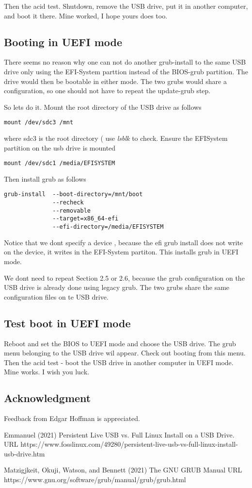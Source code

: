 \documentclass{article}  %
\begin{document}
Then the acid test. Shutdown, remove the USB drive, put it in another computer, and boot it there. Mine worked, I hope yours does too.


\subsection{Booting in UEFI mode}
 There seems no reason why one can not do another grub-install  to the same USB drive only using the EFI-System parttion instead of the BIOS-grub partition. The drive would then be bootable in either mode. The two grubs would share a configuration, so one should not have to repeat the update-grub step.

So lets do it. Mount the root directory of the USB drive as follows
\begin{verbatim}
mount /dev/sdc3 /mnt
\end{verbatim}
 where sdc3 is the root directory ( use {\em lsblk} to check.
Ensure the EFISystem partition on the usb drive is mounted
\begin{verbatim}
mount /dev/sdc1 /media/EFISYSTEM
\end{verbatim}

 Then install grub as follows
\begin{verbatim}
grub-install  --boot-directory=/mnt/boot
              --recheck
              --removable
              --target=x86_64-efi
              --efi-directory=/media/EFISYSTEM
\end{verbatim}
 Notice that we dont specify a device , because the efi grub install does not write on the device, it writes in the EFI-System partiton.  This installs grub in UEFI mode.

We dont need to repeat Section 2.5 or 2.6, because the grub configuration on the USB drive is already done using legacy grub. The two grubs share the same configuration files on te USB drive.

\subsection{Test boot in UEFI mode}
Reboot and set the BIOS to UEFI mode and choose the USB drive.  The grub menu belonging to the USB drive wil appear. Check out booting from this menu. 
Then the acid test - boot the USB drive in another computer in UEFI mode. Mine works. I wish you luck.

\subsection{Acknowledgment}
Feedback from Edgar Hoffman is appreciated.

\begin{thebibliography}{99}

Emmanuel (2021) Persistent Live USB vs. Full Linux Install on a USB Drive. URL https://www.fosslinux.com/49280/persistent-live-usb-vs-full-linux-install-usb-drive.htm 

Matzigjkeit, Okuji, Watson, and Bennett (2021) The GNU GRUB Manual URL https://www.gnu.org/software/grub/manual/grub/grub.html

\end{thebibliography}
\end{document}
